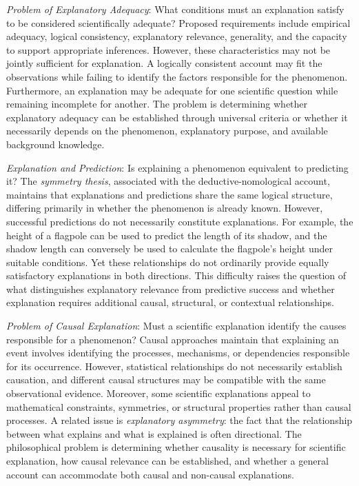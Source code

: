 \emph{Problem of Explanatory Adequacy}: What conditions must an explanation satisfy to be considered scientifically adequate? Proposed requirements include empirical adequacy, logical consistency, explanatory relevance, generality, and the capacity to support appropriate inferences. However, these characteristics may not be jointly sufficient for explanation. A logically consistent account may fit the observations while failing to identify the factors responsible for the phenomenon. Furthermore, an explanation may be adequate for one scientific question while remaining incomplete for another. The problem is determining whether explanatory adequacy can be established through universal criteria or whether it necessarily depends on the phenomenon, explanatory purpose, and available background knowledge.

\emph{Explanation and Prediction}: Is explaining a phenomenon equivalent to predicting it? The \emph{symmetry thesis}, associated with the deductive-nomological account, maintains that explanations and predictions share the same logical structure, differing primarily in whether the phenomenon is already known. However, successful predictions do not necessarily constitute explanations. For example, the height of a flagpole can be used to predict the length of its shadow, and the shadow length can conversely be used to calculate the flagpole's height under suitable conditions. Yet these relationships do not ordinarily provide equally satisfactory explanations in both directions. This difficulty raises the question of what distinguishes explanatory relevance from predictive success and whether explanation requires additional causal, structural, or contextual relationships.

\emph{Problem of Causal Explanation}: Must a scientific explanation identify the causes responsible for a phenomenon? Causal approaches maintain that explaining an event involves identifying the processes, mechanisms, or dependencies responsible for its occurrence. However, statistical relationships do not necessarily establish causation, and different causal structures may be compatible with the same observational evidence. Moreover, some scientific explanations appeal to mathematical constraints, symmetries, or structural properties rather than causal processes. A related issue is \emph{explanatory asymmetry}: the fact that the relationship between what explains and what is explained is often directional. The philosophical problem is determining whether causality is necessary for scientific explanation, how causal relevance can be established, and whether a general account can accommodate both causal and non-causal explanations.

